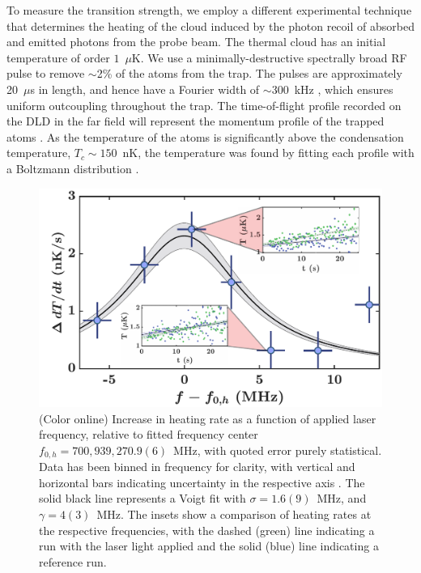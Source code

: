 \documentclass[%
 reprint,
 amsmath,amssymb,
 aps,
 prl,
]{revtex4-2}
\begin{document}

To measure the transition strength, we employ a different experimental technique that determines the heating of the cloud induced by the photon recoil of absorbed and emitted photons from the probe beam. The thermal cloud has an initial temperature of order \(1\)~\(\mu\)K.  We use a minimally-destructive spectrally broad RF pulse to remove \(\sim\)2\% of the atoms from the trap. The pulses are approximately 20~\(\mu\)s in length, and hence have a Fourier width of \(\sim 300\)~kHz \cite{Manning:10}, which ensures uniform outcoupling throughout the trap. The time-of-flight profile recorded on the DLD in the far field will represent the momentum profile of the trapped atoms \cite{Yavin2002}. As the temperature of the atoms is significantly above the condensation temperature, \(T_c \sim 150\)~nK, the temperature was found by fitting each profile with a Boltzmann distribution \cite{SOMs}.
%
\begin{figure}[t]
    \centering
    \includegraphics[width=\linewidth]{heating_scan_voigt} %
    \caption{(Color online) Increase in heating rate as a function of applied laser frequency, relative to fitted frequency center \(f_{0,h} = 700,939,270.9(6)\)~MHz, with quoted error purely statistical. Data has been binned in frequency for clarity, with vertical and horizontal bars indicating uncertainty in the respective axis \cite{standard_error_note}. The solid black line represents a Voigt fit with \(\sigma=1.6(9)\)~MHz, and \(\gamma=4(3)\)~MHz. The insets show a comparison of heating rates at the respective frequencies, with the dashed (green) line indicating a run with the laser light applied and the solid (blue) line indicating a reference run.
    }
    \label{fig:427nm_signal_heating}
\end{figure}
\end{document}

